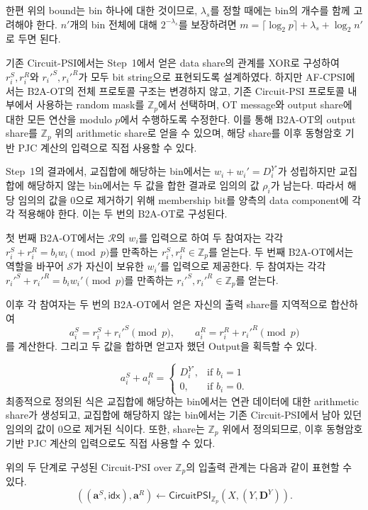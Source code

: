 \documentclass[sigconf,anonymous,review]{acmart}
\begin{document}
한편 위의 bound는 bin 하나에 대한 것이므로, $\lambda_s$를 정할 때에는 bin의
개수를 함께 고려해야 한다. $n'$개의 bin 전체에 대해 $2^{-\lambda_s}$를
보장하려면 $m=\lceil\log_2 p\rceil+\lambda_s+\log_2 n'$로 두면 된다.


기존 Circuit-PSI에서는 Step~1에서 얻은 data share의 관계를 XOR로 구성하여
\(r_i^S, r_i^R\)와 \(r_i'^S, r_i'^R\)가 모두 bit string으로
표현되도록 설계하였다.
하지만 AF-CPSI에서는 B2A-OT의 전체 프로토콜 구조는 변경하지 않고,
기존 Circuit-PSI 프로토콜 내부에서 사용하는 random mask를
\(\mathbb{Z}_p\)에서 선택하며,
OT message와 output share에 대한 모든 연산을 modulo \(p\)에서
수행하도록 수정한다.
이를 통해 B2A-OT의 output share를 \(\mathbb{Z}_p\) 위의
arithmetic share로 얻을 수 있으며,
해당 share를 이후 동형암호 기반 PJC 계산의 입력으로 직접 사용할 수 있다.

Step~1의 결과에서, 교집합에 해당하는 bin에서는
\(w_i+w_i'=D_i^{Y'}\)가 성립하지만 교집합에 해당하지 않는 bin에서는
두 값을 합한 결과로 임의의 값 \(\rho_i\)가 남는다. 따라서 해당
임의의 값을 \(0\)으로 제거하기 위해 membership bit를 양측의 data
component에 각각 적용해야 한다. 이는 두 번의 B2A-OT로 구성된다.

첫 번째 B2A-OT에서는 $\mathcal{R}$의 \(w_i\)를 입력으로 하여
두 참여자는 각각 \(r_i^S+r_i^R=b_iw_i\pmod p\)를 만족하는
\(r_i^S,r_i^R\in\mathbb{Z}_p\)를 얻는다. 
두 번째 B2A-OT에서는 역할을 바꾸어 $\mathcal{S}$가 자신이 보유한
\(w_i'\)를 입력으로 제공한다. 두 참여자는 각각 \(r_i'^S+r_i'^R=b_iw_i'\pmod p\)를 만족하는
\(r_i'^S,r_i'^R\in\mathbb{Z}_p\)를 얻는다.

이후 각 참여자는 두 번의 B2A-OT에서 얻은 자신의 출력 share를 지역적으로
합산하여
\[
    a_i^S=r_i^S+r_i'^S\pmod p,
    \qquad
    a_i^R=r_i^R+r_i'^R\pmod p
\]
를 계산한다. 그리고 두 값을 합하면 얻고자 했던 Output을 획득할 수 있다.

\[
    a_i^S+a_i^R
    =
    \begin{cases}
        D_i^{Y'}, & \text{if } b_i=1\\
        0, & \text{if } b_i=0.
    \end{cases}
\]
최종적으로 정의된 식은 교집합에 해당하는 bin에서는 연관 데이터에 대한 arithmetic
share가 생성되고, 교집합에 해당하지 않는 bin에서는 기존
Circuit-PSI에서 남아 있던 임의의 값이 \(0\)으로 제거된 식이다.
또한, share는 \(\mathbb{Z}_p\) 위에서 정의되므로,
이후 동형암호 기반 PJC 계산의 입력으로도 직접 사용할 수 있다.

위의 두 단계로 구성된 Circuit-PSI over $\mathbb{Z}_p$의
입출력 관계는 다음과 같이 표현할 수 있다.
\[
\left(
    (\mathbf{a}^S,\mathsf{idx}),
    \mathbf{a}^R
\right)
\leftarrow
\mathsf{CircuitPSI}_{\mathbb{Z}_p}
\left(
    X,
    (Y,\mathbf{D}^Y)
\right).
\]
\end{document}
